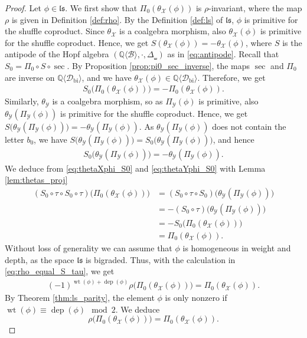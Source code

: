 \documentclass[12pt,reqno]{amsart}
\numberwithin{equation}{section}
\theoremstyle{definition}
\newcommand{\QQ}{\mathbb{Q}}
\newcommand{\wt}{\operatorname{wt}}
\newcommand{\dep}{\operatorname{dep}}
\newcommand{\B}{\mathcal{B}}
\newcommand{\QB}{\QQ\langle \B\rangle}
\newcommand{\X}{\mathcal{X}}
\newcommand{\Y}{\mathcal{Y}}
\newcommand{\Dbi}{\mathcal{D}_{\operatorname{bi}}}
\newcommand{\QDbi}{\QQ\langle \Dbi\rangle}
\newcommand{\ls}{\mathfrak{ls}}
\newcommand{\shco}{\Delta_{\shuffle}}
\newcommand{\pizero}{\Pi_0}
\newcommand{\piY}{\Pi_\Y}
\newcommand{\thetaX}{\theta_\X}
\newcommand{\thetaY}{\theta_\Y}
\begin{document}
\begin{proof} 
Let $\phi\in \ls$. We first show that $\pizero(\thetaX(\phi))$ is $\rho$-invariant, where the map $\rho$ is given in Definition \ref{def:rho}. By the Definition \ref{def:ls} of $\ls$, $\phi$ is primitive for the shuffle coproduct. Since $\thetaX$ is a coalgebra morphism, also $\thetaX(\phi)$ is primitive for the shuffle coproduct. Hence, we get
$S(\thetaX(\phi))=-\thetaX(\phi)$, where $S$ is the antipode of the Hopf algebra $(\QB,\cdot,\shco)$ as in \eqref{eq:antipode}. Recall that $S_0=\pizero\circ S\circ \sec$. By Proposition \ref{prop:pi0_sec_inverse}, the maps $\sec$ and $\pizero$ are inverse on $\QDbi$, and we have $\thetaX(\phi)\in \QDbi$. Therefore, we get  
\begin{align} \label{eq:thetaXphi_S0} S_0\big(\pizero(\thetaX(\phi))\big)=-\pizero(\thetaX(\phi)).
\end{align}
Similarly, $\thetaY$ is a coalgebra morphism, so as $\piY(\phi)$ is primitive, also $\thetaY(\piY(\phi))$ is primitive for the shuffle coproduct. Hence, we get $S\big(\thetaY(\piY(\phi))\big)=-\thetaY(\piY(\phi))$. As $\thetaY(\piY(\phi))$ does not contain the letter $b_0$, we have $S\big(\thetaY(\piY(\phi))\big)=S_0\big(\thetaY(\piY(\phi))\big)$, and hence
\begin{align} \label{eq:thetaYphi_S0}
S_0\big(\thetaY(\piY(\phi))\big)=-\thetaY(\piY(\phi)).
\end{align}
We deduce from \eqref{eq:thetaXphi_S0} and \eqref{eq:thetaYphi_S0} with Lemma \ref{lem:thetas_proj}
\begin{align*}
(S_0\circ \tau\circ S_0\circ \tau)\big(\pizero(\thetaX(\phi))\big)&=(S_0\circ \tau\circ S_0)\big(\thetaY(\piY(\phi))\big) \\
&=-(S_0\circ \tau)\big(\thetaY(\piY(\phi))\big) \\
&=-S_0\big(\pizero(\thetaX(\phi))\big) \\
&=\pizero(\thetaX(\phi)).
\end{align*}
Without loss of generality we can assume that $\phi$ is homogeneous in weight and depth, as the space $\ls$ is bigraded. Thus, with the calculation in \eqref{eq:rho_equal_S_tau}, we get
\begin{align*}
(-1)^{\wt(\phi)+\dep(\phi)}\rho\big(\pizero(\thetaX(\phi))\big)=\pizero(\thetaX(\phi)).
\end{align*}
By Theorem \ref{thm:ls_parity}, the element $\phi$ is only nonzero if $\wt(\phi)\equiv \dep(\phi) \mod 2$. We deduce
\[\rho\big(\pizero(\thetaX(\phi))\big)=\pizero(\thetaX(\phi)).\]

\end{proof}
\end{document}

